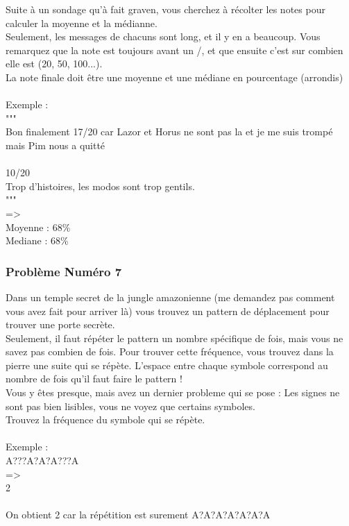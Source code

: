 \documentclass[12pt]{article}
\begin{document}
Suite à un sondage qu'à fait graven, vous cherchez à récolter les notes pour calculer la moyenne et la médianne.\\
Seulement, les messages de chacuns sont long, et il y en a beaucoup. Vous remarquez que la note est toujours avant un /, et que ensuite c'est sur combien elle est (20, 50, 100...).\\
La note finale doit être une moyenne et une médiane en pourcentage (arrondis)
\\\\
Exemple :\\
"""\\
Bon finalement 17/20 car Lazor et Horus ne sont pas la et je me suis trompé mais Pim nous a quitté
\\\\
10/20\\
Trop d’histoires, les modos sont trop gentils.\\
"""\\
=\textgreater\\
Moyenne : 68\%\\
Mediane : 68\%\\

\subsubsection{Problème Numéro 7}

Dans un temple secret de la jungle amazonienne (me demandez pas comment vous avez fait pour arriver là) vous trouvez un pattern de déplacement pour trouver une porte secrète.\\
Seulement, il faut répéter le pattern un nombre spécifique de fois, mais vous ne savez pas combien de fois. Pour trouver cette fréquence, vous trouvez dans la pierre une suite qui se répète. L'espace entre chaque symbole correspond au nombre de fois qu'il faut faire le pattern !\\
Vous y êtes presque, mais avez un dernier probleme qui se pose : Les signes ne sont pas bien lisibles, vous ne voyez que certains symboles.\\
Trouvez la fréquence du symbole qui se répète.
\\\\
Exemple :\\
A???A?A?A???A\\
=\textgreater\\
2
\\\\
On obtient 2 car la répétition est surement A?A?A?A?A?A?A
\end{document}

